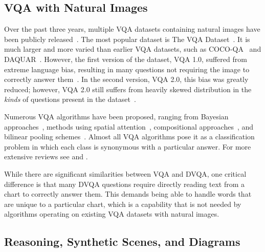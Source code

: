 \documentclass[10pt,twocolumn,letterpaper]{article}
\begin{document}
\subsection{VQA with Natural Images}
Over the past three years, multiple VQA datasets containing natural images have been publicly released~\cite{malinowski2014multi,antol2015vqa,ren2015image,krishnavisualgenome,kafle2017analysis}. The most popular dataset is The VQA Dataset~\cite{balanced_vqa_v2,antol2015vqa}. It is much larger and more varied than earlier VQA datasets, such as COCO-QA~\cite{ren2015image} and DAQUAR~\cite{malinowski2014multi}. However, the first version of the dataset, VQA 1.0, suffered from extreme language bias, resulting in many questions not requiring the image to correctly answer them~\cite{balanced_vqa_v2}. In the second version, VQA 2.0, this bias was greatly reduced; however, VQA 2.0 still suffers from heavily skewed distribution in the \emph{kinds} of questions present in the dataset~\cite{kafle2017analysis}.

Numerous VQA algorithms have been proposed, ranging from Bayesian approaches~\cite{kafle2016,malinowski2014multi}, methods using spatial attention~\cite{Yang2016,xu2015show,LuYBP16,noh2016training}, compositional approaches~\cite{AndreasRDK15,andreas2016learning}, and bilinear pooling schemes~\cite{kim2016hadamard,FukuiPYRDR16}. Almost all VQA algorithms pose it as a classification problem in which each class is synonymous with a particular answer. For more extensive reviews see \cite{kafle2016review} and \cite{wu2016visual}.

While there are significant similarities between VQA and DVQA, one critical difference is that many DVQA questions require directly reading text from a chart to correctly answer them. This demands being able to handle words that are unique to a particular chart, which is a capability that is not needed by algorithms operating on existing VQA datasets with natural images. 

\subsection{Reasoning, Synthetic Scenes, and Diagrams}
\end{document}
